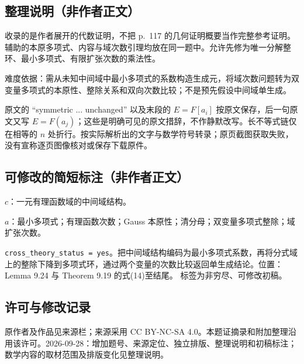 \documentclass[UTF8,11pt]{ctexart}
\theoremstyle{definition}
\begin{document}
\subsection*{整理说明（非作者正文）}
收录的是作者展开的代数证明，不把 p.~117 的几何证明概要当作完整参考证明。辅助的本原多项式、内容与域次数引理均放在同一题中。允许先修为唯一分解整环、最小多项式、有限扩张次数的乘法性。

难度依据：需从未知中间域中最小多项式的系数构造生成元，将域次数问题转为双变量多项式的本原性、整除关系和双向次数比较；不是预先假设中间域单生成。

原文的 ``symmetric ... unchanged'' 以及末段的 $E=F[a_i]$ 按原文保存，后一句原文又写 $E=F(a_j)$；这些是明确可见的原文措辞，不作静默改写。长不等式链仅在相等的 $n$ 处折行。按实际解析出的文字与数学符号转录；原页截图获取失败，没有宣称逐页图像核对或保存下载原件。
\subsection*{可修改的简短标注（非作者正文）}
$c$：一元有理函数域的中间域结构。

$a$：最小多项式；有理函数次数；Gauss 本原性；清分母；双变量多项式整除；域扩张次数。

\texttt{cross\_theory\_status = yes}。把中间域结构编码为最小多项式系数，再将分式域上的整除下降到多项式环，通过两个变量的次数比较返回单生成结论。位置：Lemma 9.24 与 Theorem 9.19 的式(14)至结尾。
标签为非穷尽、可修改初稿。
\subsection*{许可与修改记录}
原作者及作品见来源栏；来源采用 CC BY-NC-SA 4.0。本题证摘录和附加整理沿用该许可。2026-09-28：增加题号、来源定位、独立排版、整理说明和初稿标注；数学内容的取材范围及排版变化见整理说明。
\end{document}
